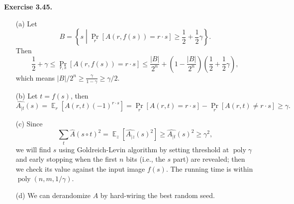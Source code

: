 \documentclass[a4paper]{article}
\newenvironment{exercise}[1]{
	\par
	\noindent\textbf{Exercise #1.}\quad
}{
	\par
	\bigskip
}
\DeclareMathOperator{\E}{\mathbb E}
\DeclareMathOperator{\poly}{\mathrm{poly}}
\newcommand{\pbra}[1]{{\left( #1 \right)}}
\newcommand{\cbra}[1]{{\left\{ #1 \right\}}}
\newcommand{\sbra}[1]{{\left[ #1 \right]}}
\begin{document}
\begin{exercise}{3.45}
    \begin{itemize}
        \item[(a)] Let
            $$
            B=\cbra{s\middle|\Pr_r\sbra{A(r,f(s))=r\cdot s}\geq\frac12+\frac12\gamma}.
            $$
            Then 
            $$
            \frac12+\gamma\leq\Pr_{r,s}\sbra{A(r,f(s))=r\cdot s}\leq\frac{|B|}{2^n}+\pbra{1-\frac{|B|}{2^n}}\pbra{\frac12+\frac12\gamma},
            $$
            which means $|B|/2^n\geq\frac{\gamma}{1-\gamma}\geq\gamma/2$.
        \item[(b)] Let $t=f(s)$, then
            $$
            \widehat{A_{|t}}(s)=\E_r\sbra{A(r,t)(-1)^{r\cdot s}}=\Pr_r[A(r,t)=r\cdot s]-\Pr_r[A(r,t)\neq r\cdot s]
            \geq\gamma.
            $$
        \item[(c)] Since
            $$
            \sum_{t}\hat A(s\circ t)^2=\E_z\sbra{\widehat{A_{|z}}(s)^2}\geq\widehat{A_{|t}}(s)^2\geq\gamma^2,
            $$
            we will find $s$ using Goldreich-Levin algorithm by setting threshold at $\poly\gamma$ and early stopping when
            the first $n$ bits (i.e., the $s$ part) are revealed; then we check its value against the input image $f(s)$.
            The running time is within $\poly(n,m,1/\gamma)$.
        \item[(d)] We can derandomize $A$ by hard-wiring the best random seed.
    \end{itemize}
\end{exercise}
\end{document}
